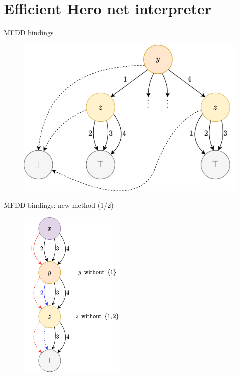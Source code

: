 \documentclass[10pt]{beamer}
\begin{document}
\section{Efficient Hero net interpreter}

\begin{frame}[fragile]{MFDD bindings}
    \begin{figure}
        \centering
        \includegraphics[width=1.0\textwidth]{07mfddold.png}
    \end{figure}
\end{frame}

\begin{frame}[fragile]{MFDD bindings: new method (1/2)}
    \begin{figure}
        \centering
        \includegraphics[width=0.45\textwidth]{08mfddnew.png}
    \end{figure}
\end{frame}
\end{document}
